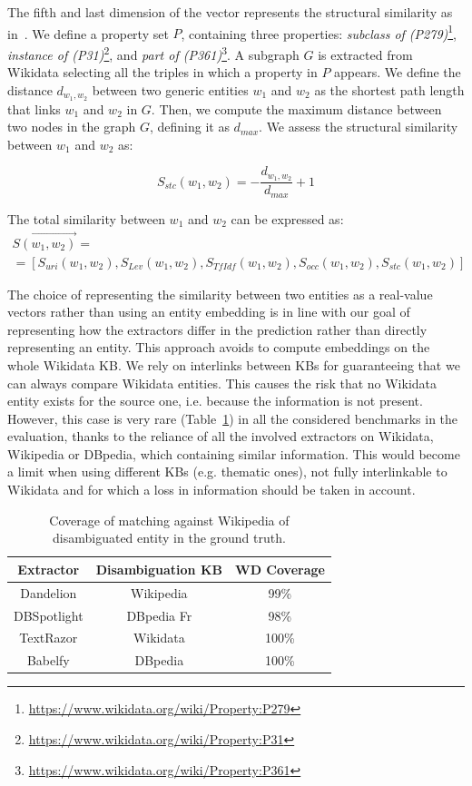 \documentclass{llncs}
\newcommand{\tabref}[1]{\mbox{Table~\ref{#1}}}
\begin{document}
The fifth and last dimension of the vector represents the structural similarity as in~\cite{CollaborativeKnowledgeBaseEmbeddingforRecommenderSystems}. We define a property set $P$, containing three properties:
\textit{subclass of (P279)}\footnote{\url{https://www.wikidata.org/wiki/Property:P279}},
\textit{instance of (P31)}\footnote{\url{https://www.wikidata.org/wiki/Property:P31}}, and \textit{part of (P361)}\footnote{\url{https://www.wikidata.org/wiki/Property:P361}}.
A subgraph $G$ is extracted from Wikidata selecting all the triples in which a property in $P$ appears. We define the distance $d_{w_1,w_2}$ between two generic entities $w_1$ and $w_2$ as the shortest path length that links $w_1$ and $w_2$ in $G$. Then, we compute the maximum distance between two nodes in the graph $G$, defining it as $d_{max}$. We assess the structural similarity between $w_1$ and $w_2$ as:

$$S_{stc}(w_1,w_2) = -\frac{d_{w_1,w_2}}{d_{max}} + 1 $$

The total similarity between $w_1$ and $w_2$ can be expressed as:
\begin{equation}
\begin{gathered}
 \vec{S(w_1,w_2)} = \\
 = [S_{uri}(w_1,w_2),S_{Lev}(w_1,w_2),S_{TfIdf}(w_1,w_2),S_{occ}(w_1,w_2),S_{stc}(w_1,w_2)]
\end{gathered}
\end{equation}

The choice of representing the similarity between two entities as a real-value vectors rather than using an entity embedding is in line with our goal of representing how the extractors differ in the prediction rather than directly representing an entity. This approach avoids to compute embeddings on the whole Wikidata KB. We rely on interlinks between KBs for guaranteeing that we can always compare Wikidata entities. This causes the risk that no Wikidata entity exists for the source one, i.e. because the information is not present. However, this case is very rare (\tabref{tab:qmatch}) in all the considered benchmarks in the evaluation, thanks to the reliance of all the involved extractors on Wikidata, Wikipedia or DBpedia, which containing similar information. This would become a limit when using different KBs (e.g. thematic ones), not fully interlinkable to Wikidata and for which a loss in information should be taken in account.

\begin{table}[t]
\centering
\label{tab:qmatch}
\begin{tabular}{|c|c|c|}
\hline
\textbf{Extractor} & \textbf{Disambiguation KB} & \textbf{WD Coverage} \\ \hline
Dandelion    & Wikipedia   & 99\%     \\ \hline
DBSpotlight  & DBpedia Fr  & 98\%     \\ \hline
TextRazor    & Wikidata    & 100\%    \\ \hline
Babelfy      & DBpedia     & 100\%    \\ \hline
\end{tabular}
\bigskip
\caption{Coverage of matching against Wikipedia of disambiguated entity in the ground truth.}
\end{table}
\end{document}
